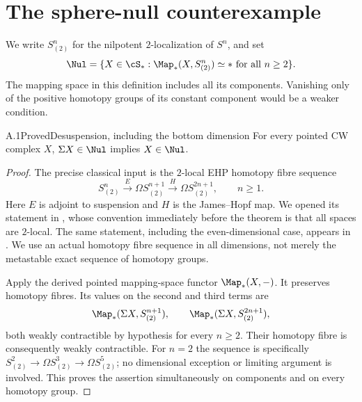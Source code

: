 \section{The sphere-null counterexample}

We write $S^n_{(2)}$ for the nilpotent $2$-localization of $S^n$, and set
\[
 \Nul=\{X\in\cS_*:\Map_*(X,S^n_{(2)})\simeq *\text{ for all }n\geq2\}.
\]
The mapping space in this definition includes all its components. Vanishing only of the positive homotopy groups of its constant component would be a weaker condition.

\begin{claim}{A.1}{Proved}{Desuspension, including the bottom dimension}\label{A1}
For every pointed CW complex $X$, $\Sigma X\in\Nul$ implies $X\in\Nul$.
\end{claim}
\begin{proof}
The precise classical input is the $2$-local EHP homotopy fibre sequence
\[
 S^n_{(2)}\xrightarrow{E}\Omega S^{n+1}_{(2)}
       \xrightarrow{H}\Omega S^{2n+1}_{(2)},\qquad n\geq1.
\]
Here $E$ is adjoint to suspension and $H$ is the James--Hopf map. We opened its statement in \citet[Theorem 2.2]{Boyde2023}, whose convention immediately before the theorem is that all spaces are $2$-local. The same statement, including the even-dimensional case, appears in \citet[Theorem 1(ii), with $p=2$]{RavenelEHP2005}. We use an actual homotopy fibre sequence in all dimensions, not merely the metastable exact sequence of homotopy groups.

Apply the derived pointed mapping-space functor $\Map_*(X,-)$. It preserves homotopy fibres. Its values on the second and third terms are
\[
 \Map_*(\Sigma X,S^{n+1}_{(2)}),\qquad
 \Map_*(\Sigma X,S^{2n+1}_{(2)}),
\]
both weakly contractible by hypothesis for every $n\geq2$. Their homotopy fibre is consequently weakly contractible. For $n=2$ the sequence is specifically
$S^2_{(2)}\to\Omega S^3_{(2)}\to\Omega S^5_{(2)}$; no dimensional exception or limiting argument is involved. This proves the assertion simultaneously on components and on every homotopy group.
\end{proof}


